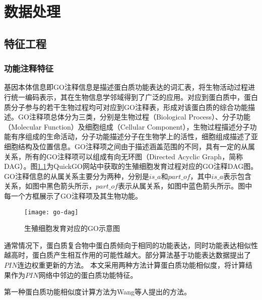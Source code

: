 \chapter{数据处理}
\label{chapter:dataprocess}

\section{特征工程}
\label{section:featEngineer}
\subsection{功能注释特征}
\label{subsection:GoSimilarity}

基因本体信息\cite{ashburner_gene_2000}即GO注释信息是描述蛋白质功能表达的词汇表，将生物活动过程进行统一编码表示，其在生物信息学邻域得到了广泛的应用。对应到蛋白质中，蛋白质分子参与的若干生物过程均可对应到GO注释表，形成对该蛋白质的综合功能描述。GO注释项总体分为三类，分别是生物过程（Biological Process）、分子功能（Molecular Function）及细胞组成（Cellular Component），生物过程描述分子功能有序组成的生命活动，分子功能描述分子在生物学上的活性，细胞组成描述了亚细胞结构及位置信息。GO注释项之间由于描述涵盖范围的不同，具有一定的从属关系，所有的GO注释项可以组成有向无环图（Directed Acyclic Graph，简称DAG）。图\ref{fig:go-dag}为QuickGO\cite{binns_quickgo_2009}网站中获取的生殖细胞发育过程对应的GO注释DAG图。GO注释信息的从属关系主要分为两种，分别是$is\_a$和$part\_of$，其中$is\_a$表示包含关系，如图中黑色箭头所示，$part\_of$表示从属关系，如图中蓝色箭头所示。图中每一个方框展示了GO注释项及其生物功能。
\begin{figure}[htbp]
    \centering
    \texttt{[image: go-dag]}
    \caption{生殖细胞发育对应的GO示意图}
    \label{fig:go-dag}
\end{figure}

通常情况下，蛋白质复合物中蛋白质倾向于相同的功能表达，同时功能表达相似性越高时，蛋白质产生相互作用的可能性越大。部分算法\cite{ulitsky_identification_2007,jianxing_feng_max-flow-based_2011}基于功能表达数据提出了$PIN$连边权重更新的方法。
本文采用两种方法计算蛋白质功能相似度，将计算结果作为$PIN$网络中邻边的蛋白质功能特征。

第一种蛋白质功能相似度计算方法为Wang等人\cite{wang_new_2007}提出的方法。

